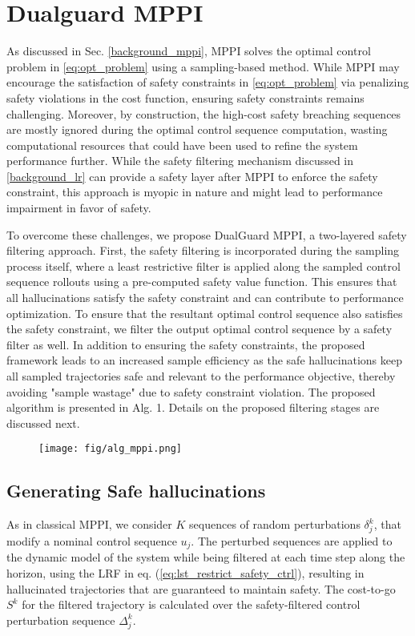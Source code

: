 \section{\label{approach}Dualguard MPPI}

As discussed in Sec. \ref{background_mppi}, MPPI solves the optimal control problem in \eqref{eq:opt_problem} using a sampling-based method. While MPPI may encourage the satisfaction of safety constraints in \eqref{eq:opt_problem} via penalizing safety violations in the cost function, ensuring safety constraints remains challenging. Moreover, by construction, the high-cost safety breaching sequences are mostly ignored during the optimal control sequence computation, wasting computational resources that could have been used to refine the system performance further. While the safety filtering mechanism discussed in \ref{background_lr} can provide a safety layer after MPPI to enforce the safety constraint, this approach is myopic in nature and might lead to performance impairment in favor of safety.

To overcome these challenges, we propose DualGuard MPPI, a two-layered safety filtering approach. First, the safety filtering is incorporated during the sampling process itself, where a least restrictive filter is applied along the sampled control sequence rollouts using a pre-computed safety value function. This ensures that all hallucinations satisfy the safety constraint and can contribute to performance optimization. To ensure that the resultant optimal control sequence also satisfies the safety constraint, we filter the output optimal control sequence by a safety filter as well. In addition to ensuring the safety constraints, the proposed framework leads to an increased sample efficiency as the safe hallucinations keep all sampled trajectories safe and relevant to the performance objective, thereby avoiding "sample wastage" due to safety constraint violation. The proposed algorithm is presented in Alg. 1. Details on the proposed filtering stages are discussed next.

\begin{figure}[t] 
\begin{center} 
\vspace{0.0em}
\texttt{[image: fig/alg\_mppi.png]}
\vspace{-1em}
\end{center}
\end{figure}
%
\subsection{\label{safe_hallucinations}Generating Safe hallucinations}
%
As in classical MPPI, we consider $K$ sequences of random perturbations $\delta_j^k$, that modify a nominal control sequence $u_j$. The perturbed sequences are applied to the dynamic model of the system while being filtered at each time step along the horizon, using  the LRF in eq. (\ref{eq:lst_restrict_safety_ctrl}), resulting in hallucinated trajectories that are guaranteed to maintain safety. The cost-to-go $S^k$ for the filtered trajectory is calculated over the safety-filtered control perturbation sequence $\Delta_j^k$.

